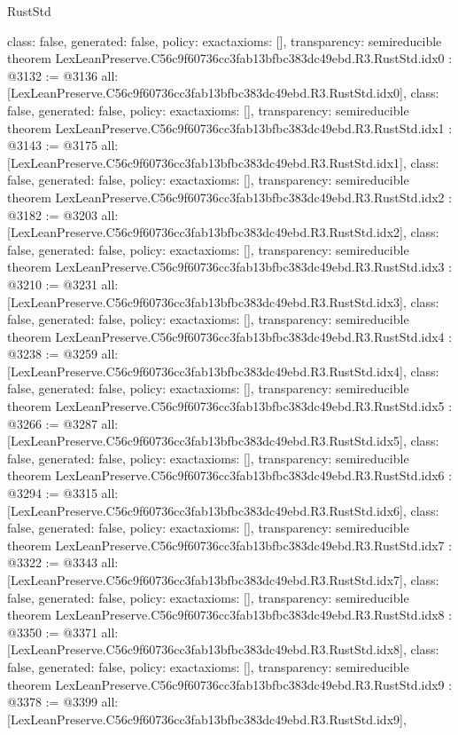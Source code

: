 \begin{lexlean}{RustStd}
\begin{coremodule}
{  class: false,
  generated: false,
  policy: exact{axioms: []},
  transparency: semireducible
}
theorem LexLeanPreserve.C56c9f60736cc3fab13bfbc383dc49ebd.R3.RustStd.idx0 : @3132 := @3136 {
  all: [LexLeanPreserve.C56c9f60736cc3fab13bfbc383dc49ebd.R3.RustStd.idx0],
  class: false,
  generated: false,
  policy: exact{axioms: []},
  transparency: semireducible
}
theorem LexLeanPreserve.C56c9f60736cc3fab13bfbc383dc49ebd.R3.RustStd.idx1 : @3143 := @3175 {
  all: [LexLeanPreserve.C56c9f60736cc3fab13bfbc383dc49ebd.R3.RustStd.idx1],
  class: false,
  generated: false,
  policy: exact{axioms: []},
  transparency: semireducible
}
theorem LexLeanPreserve.C56c9f60736cc3fab13bfbc383dc49ebd.R3.RustStd.idx2 : @3182 := @3203 {
  all: [LexLeanPreserve.C56c9f60736cc3fab13bfbc383dc49ebd.R3.RustStd.idx2],
  class: false,
  generated: false,
  policy: exact{axioms: []},
  transparency: semireducible
}
theorem LexLeanPreserve.C56c9f60736cc3fab13bfbc383dc49ebd.R3.RustStd.idx3 : @3210 := @3231 {
  all: [LexLeanPreserve.C56c9f60736cc3fab13bfbc383dc49ebd.R3.RustStd.idx3],
  class: false,
  generated: false,
  policy: exact{axioms: []},
  transparency: semireducible
}
theorem LexLeanPreserve.C56c9f60736cc3fab13bfbc383dc49ebd.R3.RustStd.idx4 : @3238 := @3259 {
  all: [LexLeanPreserve.C56c9f60736cc3fab13bfbc383dc49ebd.R3.RustStd.idx4],
  class: false,
  generated: false,
  policy: exact{axioms: []},
  transparency: semireducible
}
theorem LexLeanPreserve.C56c9f60736cc3fab13bfbc383dc49ebd.R3.RustStd.idx5 : @3266 := @3287 {
  all: [LexLeanPreserve.C56c9f60736cc3fab13bfbc383dc49ebd.R3.RustStd.idx5],
  class: false,
  generated: false,
  policy: exact{axioms: []},
  transparency: semireducible
}
theorem LexLeanPreserve.C56c9f60736cc3fab13bfbc383dc49ebd.R3.RustStd.idx6 : @3294 := @3315 {
  all: [LexLeanPreserve.C56c9f60736cc3fab13bfbc383dc49ebd.R3.RustStd.idx6],
  class: false,
  generated: false,
  policy: exact{axioms: []},
  transparency: semireducible
}
theorem LexLeanPreserve.C56c9f60736cc3fab13bfbc383dc49ebd.R3.RustStd.idx7 : @3322 := @3343 {
  all: [LexLeanPreserve.C56c9f60736cc3fab13bfbc383dc49ebd.R3.RustStd.idx7],
  class: false,
  generated: false,
  policy: exact{axioms: []},
  transparency: semireducible
}
theorem LexLeanPreserve.C56c9f60736cc3fab13bfbc383dc49ebd.R3.RustStd.idx8 : @3350 := @3371 {
  all: [LexLeanPreserve.C56c9f60736cc3fab13bfbc383dc49ebd.R3.RustStd.idx8],
  class: false,
  generated: false,
  policy: exact{axioms: []},
  transparency: semireducible
}
theorem LexLeanPreserve.C56c9f60736cc3fab13bfbc383dc49ebd.R3.RustStd.idx9 : @3378 := @3399 {
  all: [LexLeanPreserve.C56c9f60736cc3fab13bfbc383dc49ebd.R3.RustStd.idx9],
}
\end{coremodule}
\end{lexlean}
